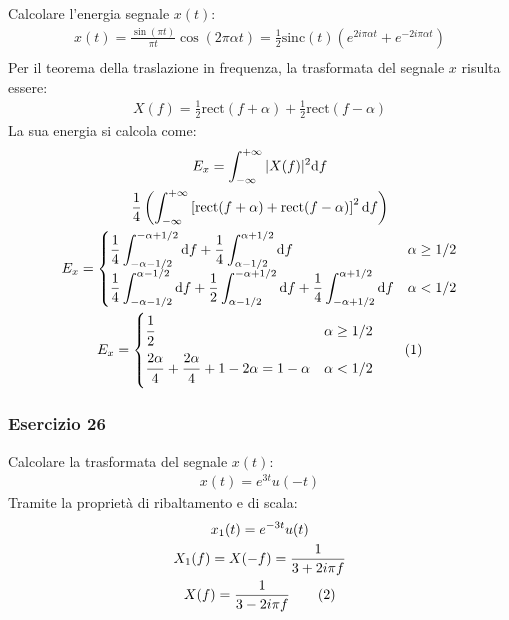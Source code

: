 \documentclass{article}
\newcommand{\rect}{\mathrm{rect}}
\newcommand{\sinc}{\mathrm{sinc}}
\newcommand{\df}{\mathrm{d}}
\newcommand{\tageq}{\tag{\stepcounter{equation}\theequation}}
\begin{document}
Calcolare l'energia segnale $x(t)$:
\begin{gather*}
    x(t)=\displaystyle\frac{\sin(\pi t)}{\pi t}\cos(2\pi \alpha t)=\frac{1}{2}\sinc(t)(e^{2i\pi\alpha t}+e^{-2i\pi\alpha t})\\
\end{gather*}
Per il teorema della traslazione in frequenza, la trasformata del segnale $x$ risulta essere:
\begin{gather*}
    X(f)=\displaystyle\frac{1}{2}\rect(f+\alpha)+\frac{1}{2}\rect(f-\alpha)
\end{gather*}
La sua energia si calcola come:
\begin{gather*}
    E_x=\displaystyle\int_{-\infty}^{+\infty}|X(f)|^2\df f\\
    \displaystyle\frac{1}{4}\left(\int_{-\infty}^{+\infty}\left[\rect(f+\alpha)+\rect(f-\alpha)\right]^2\df f\right)\\
    E_x=\begin{cases}
        \displaystyle\frac{1}{4}\int_{-\alpha-1/2}^{-\alpha+1/2}\df f+\frac{1}{4}\int_{\alpha-1/2}^{\alpha+1/2}\df f& \alpha\geq1/2\\
        \displaystyle\frac{1}{4}\int_{-\alpha-1/2}^{\alpha-1/2}\df f+\frac{1}{2}\int_{\alpha-1/2}^{-\alpha+1/2}\df f+\frac{1}{4}\int_{-\alpha+1/2}^{\alpha+1/2}\df f&\alpha<1/2
    \end{cases}\\
    E_x=\begin{cases}
        \displaystyle\frac{\strut 1}{\strut 2}&\alpha\geq1/2\\
        \displaystyle\frac{\strut 2\alpha}{\strut 4}+\frac{\strut 2\alpha}{\strut 4}+1-2\alpha=1-\alpha&\alpha<1/2
    \end{cases}\tageq
\end{gather*}

\subsubsection*{Esercizio 26}

Calcolare la trasformata del segnale $x(t)$: 
\begin{gather*}
    x(t)=e^{3t}u(-t)
\end{gather*}
Tramite la proprietà di ribaltamento e di scala: 
\begin{gather*}
    x_1(t)=e^{-3t}u(t)\\
    X_1(f)=X(-f)=\displaystyle\frac{1}{3+2i\pi f}\\
    X(f)=\displaystyle\frac{1}{3-2i\pi f}\tageq
\end{gather*}
\end{document}
